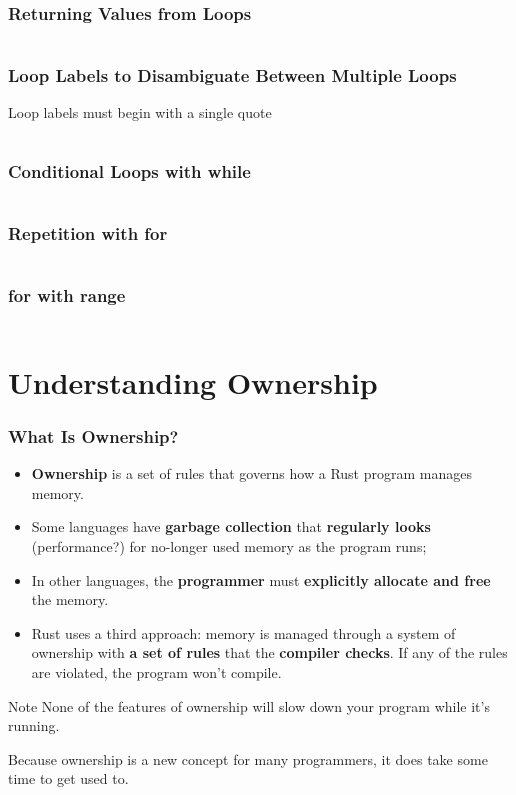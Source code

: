 \documentclass{beamer}
\begin{document}
	\begin{frame}[fragile]
		\frametitle{Returning Values from Loops}
		\inputminted{rust}{./code/loop-return.rs}
	\end{frame}
	
	\begin{frame}[fragile]
		\frametitle{Loop Labels to Disambiguate Between Multiple Loops}
		Loop labels must begin with a single quote
		\scriptsize
		\inputminted{rust}{./code/loop-label.rs}
	\end{frame}
	
	\begin{frame}[fragile]
		\frametitle{Conditional Loops with while}
		\inputminted{rust}{./code/while.rs}
	\end{frame}
	
	\begin{frame}[fragile]
		\frametitle{Repetition with for}
		\inputminted{rust}{./code/for.rs}
	\end{frame}
	
	\begin{frame}[fragile]
		\frametitle{for with range}
		\inputminted{rust}{./code/for-range.rs}
	\end{frame}
	
	\section{Understanding Ownership}
	
	\begin{frame}[fragile]
		\frametitle{What Is Ownership?}
		\begin{itemize}
			\item \textbf{Ownership} is a set of rules that governs how a Rust program manages memory.
			\item 		Some languages have \textbf{garbage collection} that \textbf{regularly looks} (performance?) for no-longer used memory as the program runs;
			\item 		 In other languages, the \textbf{programmer} must \textbf{explicitly allocate and free} the memory.
			\item 		 Rust uses a third approach: memory is managed through a system of ownership with \textbf{a set of rules} that the\textbf{ compiler checks}. If any of the rules are violated, the program won’t compile.
		\end{itemize}
		\begin{block}{Note}
			None of the features of ownership will slow down your program while it’s running.
		\end{block}
		\tiny Because ownership is a new concept for many programmers, it does take some time to get used to.
	\end{frame}
	
\end{document}
